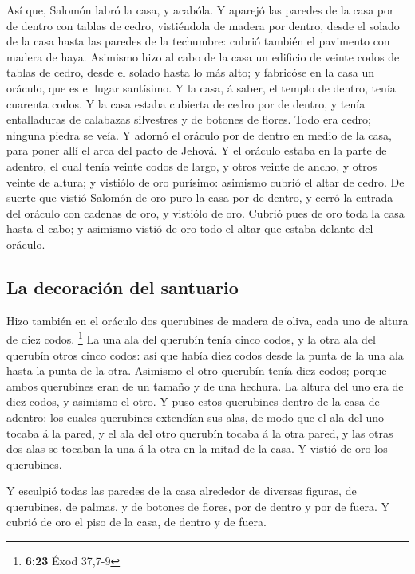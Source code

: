  Así que, Salomón labró la casa, y acabóla.  Y
aparejó las paredes de la casa por de dentro con tablas de cedro,
vistiéndola de madera por dentro, desde el solado de la casa hasta las
paredes de la techumbre: cubrió también el pavimento con madera de haya.
 Asimismo hizo al cabo de la casa un edificio de veinte
codos de tablas de cedro, desde el solado hasta lo más alto; y fabricóse
en la casa un oráculo, que es el lugar santísimo.  Y la
casa, á saber, el templo de dentro, tenía cuarenta codos. 
Y la casa estaba cubierta de cedro por de dentro, y tenía entalladuras
de calabazas silvestres y de botones de flores. Todo era cedro; ninguna
piedra se veía.  Y adornó el oráculo por de dentro en medio
de la casa, para poner allí el arca del pacto de Jehová.  Y
el oráculo estaba en la parte de adentro, el cual tenía veinte codos de
largo, y otros veinte de ancho, y otros veinte de altura; y vistiólo de
oro purísimo: asimismo cubrió el altar de cedro.  De suerte
que vistió Salomón de oro puro la casa por de dentro, y cerró la entrada
del oráculo con cadenas de oro, y vistiólo de oro.  Cubrió
pues de oro toda la casa hasta el cabo; y asimismo vistió de oro todo el
altar que estaba delante del oráculo.

\hypertarget{la-decoraciuxf3n-del-santuario}{%
\subsection{La decoración del
santuario}\label{la-decoraciuxf3n-del-santuario}}

 Hizo también en el oráculo dos querubines de madera de
oliva, cada uno de altura de diez codos. \footnote{\textbf{6:23} Éxod
  37,7-9}  La una ala del querubín tenía cinco codos, y la
otra ala del querubín otros cinco codos: así que había diez codos desde
la punta de la una ala hasta la punta de la otra.  Asimismo
el otro querubín tenía diez codos; porque ambos querubines eran de un
tamaño y de una hechura.  La altura del uno era de diez
codos, y asimismo el otro.  Y puso estos querubines dentro
de la casa de adentro: los cuales querubines extendían sus alas, de modo
que el ala del uno tocaba á la pared, y el ala del otro querubín tocaba
á la otra pared, y las otras dos alas se tocaban la una á la otra en la
mitad de la casa.  Y vistió de oro los querubines.

 Y esculpió todas las paredes de la casa alrededor de
diversas figuras, de querubines, de palmas, y de botones de flores, por
de dentro y por de fuera.  Y cubrió de oro el piso de la
casa, de dentro y de fuera.

